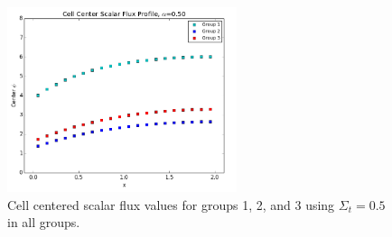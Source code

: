 \documentclass[10pt]{article}
\begin{document}
\begin{figure}[htb!]
\centering
\includegraphics[width=0.6\textwidth]{Figures/groupcenterfluxes_lowertotxsection.png}
\vspace{-7pt}
\caption{Cell centered scalar flux values for groups 1, 2, and 3 using $\Sigma_t = 0.5$ in all groups.}
\end{figure}



\end{document}
